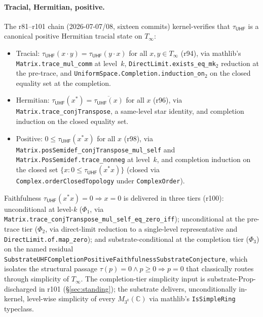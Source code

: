 \documentclass[11pt,a4paper]{amsart}
\theoremstyle{plain}
\theoremstyle{definition}
\begin{document}
\paragraph{Tracial, Hermitian, positive.} The r81--r101 chain (2026-07-07/08, sixteen commits) kernel-verifies that $\tau_{\textsf{UHF}}$ is a canonical positive Hermitian tracial state on $T_\infty$:
\begin{itemize}[itemsep=2pt]
\item Tracial: $\tau_{\textsf{UHF}}(x \cdot y) = \tau_{\textsf{UHF}}(y \cdot x)$ for all $x, y \in T_\infty$ (r94), via mathlib's \texttt{Matrix.trace\_mul\_comm} at level~$k$, \texttt{DirectLimit.exists\_eq\_mk}$_2$ reduction at the pre-trace, and \texttt{UniformSpace.Completion.induction\_on}$_2$ on the closed equality set at the completion.
\item Hermitian: $\tau_{\textsf{UHF}}(x^*) = \overline{\tau_{\textsf{UHF}}(x)}$ for all $x$ (r96), via \texttt{Matrix.trace\_conjTranspose}, a same-level star identity, and completion induction on the closed equality set.
\item Positive: $0 \le \tau_{\textsf{UHF}}(x^* x)$ for all $x$ (r98), via \texttt{Matrix.posSemidef\_conjTranspose\_mul\_self} and \texttt{Matrix.PosSemidef.trace\_nonneg} at level~$k$, and completion induction on the closed set $\{x : 0 \le \tau_{\textsf{UHF}}(x^* x)\}$ (closed via \texttt{Complex.orderClosedTopology} under \texttt{ComplexOrder}).
\end{itemize}

Faithfulness $\tau_{\textsf{UHF}}(x^* x) = 0 \Rightarrow x = 0$ is delivered in three tiers (r100): unconditional at level-$k$ ($\Phi_1$, via \texttt{Matrix.trace\_conjTranspose\_mul\_self\_eq\_zero\_iff}); unconditional at the pre-trace tier ($\Phi_2$, via direct-limit reduction to a single-level representative and \texttt{DirectLimit.of.map\_zero}); and substrate-conditional at the completion tier ($\Phi_3$) on the named residual \texttt{SubstrateUHFCompletionPositiveFaithfulnessSubstrateConjecture}, which isolates the structural passage $\tau(p) = 0 \wedge p \ge 0 \Rightarrow p = 0$ that classically routes through simplicity of $T_\infty$. The completion-tier simplicity input is substrate-Prop-discharged in r101 (\S\ref{sec:standing}); the substrate delivers, unconditionally in-kernel, level-wise simplicity of every $M_{3^k}(\mathbb{C})$ via mathlib's \texttt{IsSimpleRing} typeclass.
\end{document}
